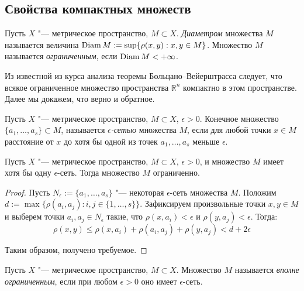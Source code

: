 \subsection{Свойства компактных множеств}

\begin{definition}
    Пусть $X$ "--- метрическое пространство, $M \subset X$. \textit{Диаметром} множества $M$ называется величина $\operatorname{Diam}{M} := \sup \{\rho(x, y): x, y \in M\}$. Множество $M$ называется \textit{ограниченным}, если $\operatorname{Diam}{M} < +\infty$.
\end{definition}

\begin{note}
    Из известной из курса анализа теоремы Больцано--Вейерштрасса следует, что всякое ограниченное множество пространства $\mathbb R^n$ компактно в этом пространстве. Далее мы докажем, что верно и обратное.
\end{note}

\begin{definition}
    Пусть $X$ "--- метрическое пространство, $M \subset X$, $\epsilon > 0$. Конечное множество $\lbrace a_1,\ldots, a_s\rbrace \subset M$, называется \textit{$\epsilon$-сетью} множества $M$, если для любой точки $x \in M$ расстояние от $x$ до хотя бы одной из точек $a_1,\ldots, a_s$ меньше $\epsilon$.
\end{definition}

\begin{proposition}
    Пусть $X$ "--- метрическое пространство, $M \subset X$, $\epsilon > 0$, и множество $M$ имеет хотя бы одну $\epsilon$-сеть. Тогда множество $M$ ограниченно.
\end{proposition}

\begin{proof}
    Пусть $N_{\epsilon} := \lbrace a_1,\ldots, a_s\rbrace$ "--- некоторая $\epsilon$-сеть множества $M$. Положим $d := \max\{\rho(a_i, a_j): i, j \in \{1, \dotsc, s\}\}$. Зафиксируем произвольные точки $x, y \in M$ и выберем точки $a_i, a_j \in N_{\epsilon}$ такие, что $\rho(x,a_i) < \epsilon$ и $\rho(y, a_j) < \epsilon$. Тогда:
    \[\rho(x, y) \leq \rho(x, a_i) + \rho(a_i, a_j) + \rho(y, a_j) < d+2\epsilon\]

    Таким образом, получено требуемое.
\end{proof}

\begin{definition}
    Пусть $X$ "--- метрическое пространство, $M \subset X$. Множество $M$ называется \textit{вполне ограниченным}, если при любом $\epsilon>0$ оно имеет $\epsilon$-сеть.
\end{definition}

